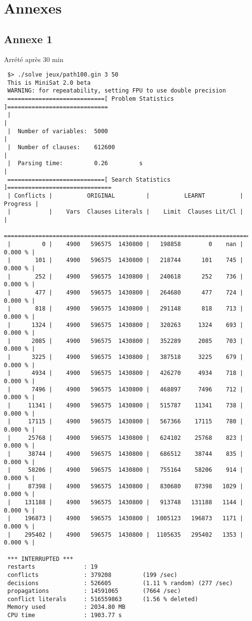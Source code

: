 \section{Annexes}
\subsection{Annexe 1}
Arrété après 30 min
\begin{lstlisting}
 $> ./solve jeux/path100.gin 3 50
 This is MiniSat 2.0 beta
 WARNING: for repeatability, setting FPU to use double precision
 ============================[ Problem Statistics ]=============================
 |                                                                             |
 |  Number of variables:  5000                                                 |
 |  Number of clauses:    612600                                               |
 |  Parsing time:         0.26         s                                       |
 ============================[ Search Statistics ]==============================
 | Conflicts |          ORIGINAL         |          LEARNT          | Progress |
 |           |    Vars  Clauses Literals |    Limit  Clauses Lit/Cl |          |
 ===============================================================================
 |         0 |    4900   596575  1430800 |   198858        0    nan |  0.000 % |
 |       101 |    4900   596575  1430800 |   218744      101    745 |  0.000 % |
 |       252 |    4900   596575  1430800 |   240618      252    736 |  0.000 % |
 |       477 |    4900   596575  1430800 |   264680      477    724 |  0.000 % |
 |       818 |    4900   596575  1430800 |   291148      818    713 |  0.000 % |
 |      1324 |    4900   596575  1430800 |   320263     1324    693 |  0.000 % |
 |      2085 |    4900   596575  1430800 |   352289     2085    703 |  0.000 % |
 |      3225 |    4900   596575  1430800 |   387518     3225    679 |  0.000 % |
 |      4934 |    4900   596575  1430800 |   426270     4934    718 |  0.000 % |
 |      7496 |    4900   596575  1430800 |   468897     7496    712 |  0.000 % |
 |     11341 |    4900   596575  1430800 |   515787    11341    738 |  0.000 % |
 |     17115 |    4900   596575  1430800 |   567366    17115    780 |  0.000 % |
 |     25768 |    4900   596575  1430800 |   624102    25768    823 |  0.000 % |
 |     38744 |    4900   596575  1430800 |   686512    38744    835 |  0.000 % |
 |     58206 |    4900   596575  1430800 |   755164    58206    914 |  0.000 % |
 |     87398 |    4900   596575  1430800 |   830680    87398   1029 |  0.000 % |
 |    131188 |    4900   596575  1430800 |   913748   131188   1144 |  0.000 % |
 |    196873 |    4900   596575  1430800 |  1005123   196873   1171 |  0.000 % |
 |    295402 |    4900   596575  1430800 |  1105635   295402   1353 |  0.000 % |
 
 *** INTERRUPTED ***
 restarts              : 19
 conflicts             : 379208         (199 /sec)
 decisions             : 526605         (1.11 % random) (277 /sec)
 propagations          : 14591065       (7664 /sec)
 conflict literals     : 516559863      (1.56 % deleted)
 Memory used           : 2034.80 MB
 CPU time              : 1903.77 s
\end{lstlisting}

